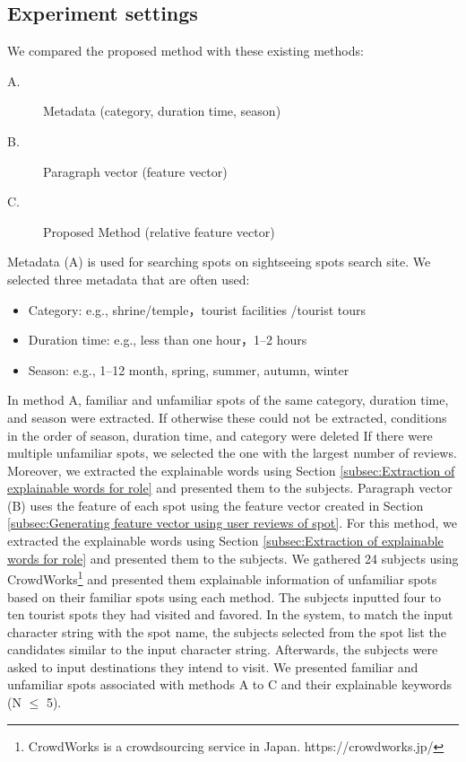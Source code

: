 \documentclass[journal]{IAENGtran}
\begin{document}
\subsection{Experiment settings}
\label{subsec:Experiment settings}
We compared the proposed method with these existing methods:
\begin{description}
\item[A.]Metadata (category, duration time, season)
\item[B.]Paragraph vector (feature vector)
\item[C.]Proposed Method (relative feature vector)
\end{description}
   Metadata (A) is used for searching spots on sightseeing spots search site. We selected three metadata that are often used:
\begin{itemize}
\item Category: e.g., shrine/temple，tourist facilities /tourist tours
\item Duration time: e.g., less than one hour，1--2 hours
\item Season: e.g., 1--12 month, spring, summer, autumn, winter
\end{itemize}
   In method A, familiar and unfamiliar spots of the same category, duration time, and season were extracted. If otherwise these could not be extracted, conditions in the order of season, duration time, and category were deleted
If there were multiple unfamiliar spots, we selected the one with the largest number of reviews. Moreover, we extracted the explainable words using Section \ref{subsec:Extraction of explainable words for role} and presented them to the subjects.
   Paragraph vector (B) uses the feature of each spot using the feature vector created in Section \ref{subsec:Generating feature vector using user reviews of spot}. For this method, we extracted the explainable words using Section \ref{subsec:Extraction of explainable words for role} and presented them to the subjects.
   We gathered 24 subjects using CrowdWorks\footnote{CrowdWorks is a crowdsourcing service in Japan. https://crowdworks.jp/} and presented them explainable information of unfamiliar spots based on their familiar spots using each method. The subjects inputted four to ten tourist spots they had visited and favored. In the system, to match the input character string with the spot name, the subjects selected from the spot list the candidates similar to the input character string. Afterwards, the subjects were asked to input destinations they intend to visit. We presented familiar and unfamiliar spots associated with methods A to C and their explainable keywords (N $\le$ 5).
\end{document}
